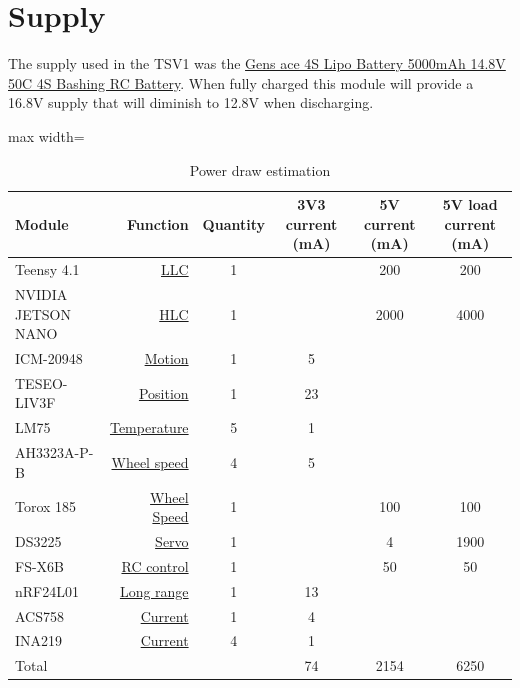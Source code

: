 \documentclass[ti,oneside,10pt]{uantwerpenreport}
\newcommand{\RmTabWS}[0]{\vspace{-6pt}} %
\begin{document}
\section{Supply}                    %
The supply used in the TSV1 was the \href{https://www.amazon.com.be/Gens-ace-Batterie-connecteur-Connection/dp/B09YXRSTMT?source=ps-sl-shoppingads-lpcontext&psc=1}{Gens ace 4S Lipo Battery 5000mAh 14.8V 50C 4S Bashing RC Battery}.
When fully charged this module will provide a 16.8V supply that will diminish to 12.8V when discharging.
\RmTabWS
\begin{table}[h!]
    \centering
    \caption{Power draw estimation}
    \begin{adjustbox}{max width=\textwidth}
        \begin{tabular}{l r c c c c}
            \toprule
                \textbf{Module} & \textbf{Function} & \textbf{Quantity} & 
                \textbf{3V3 current (mA)} & \textbf{5V current (mA)} & 
                \textbf{5V load current (mA)} \\
            \midrule
                Teensy 4.1          & \hyperref[sec:LLC]{LLC}           & 1 &    & 200  & 200  \\
                NVIDIA JETSON NANO  & \hyperref[sec:HLC]{HLC}           & 1 &    & 2000 & 4000 \\
                ICM-20948           & \hyperref[sec:IMU]{Motion}        & 1 & 5  &      & \\
                TESEO-LIV3F         & \hyperref[sec:GPS]{Position}      & 1 & 23 &      & \\
                LM75                & \hyperref[sec:TMP]{Temperature}   & 5 & 1  &      & \\
                AH3323A-P-B         & \hyperref[sec:ENC]{Wheel speed}   & 4 & 5  &      & \\
                Torox 185           & \hyperref[sec:ESC]{Wheel Speed}   & 1 &    & 100  & 100  \\
                DS3225              & \hyperref[sec:SRV]{Servo}         & 1 &    & 4    & 1900 \\
                FS-X6B              & \hyperref[sec:RCC]{RC control}    & 1 &    & 50   & 50   \\
                nRF24L01            & \hyperref[sec:LRC]{Long range}    & 1 & 13 &      & \\
                ACS758              & \hyperref[sec:AMP]{Current}       & 1 & 4  &      & \\
                INA219              & \hyperref[sec:AMP]{Current}       & 4 & 1  &      & \\
            \midrule
                Total               &               &   & 74 & 2154 & 6250 \\
            \bottomrule
        \end{tabular}
    \end{adjustbox}
    \label{tab:power_draw_estimation}
\end{table}
\end{document}
